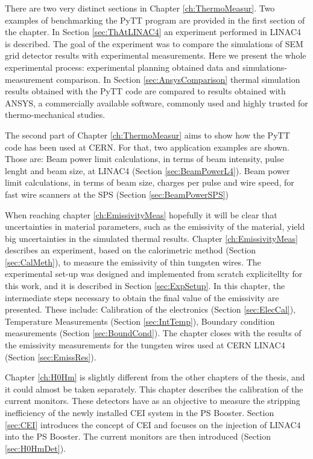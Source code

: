 There are two very distinct sections in Chapter \ref{ch:ThermoMeasur}. Two examples of benchmarking the PyTT program are provided in the first section of the chapter. In Section \ref{sec:ThAtLINAC4} an experiment performed in LINAC4 is described. The goal of the experiment was to compare the simulations of SEM grid detector results with experimental measurements. Here we present the whole experimental process: experimental planning obtained data and simulations-measurement comparison. In Section \ref{sec:AnsysComparison} thermal simulation results obtained with the PyTT code are compared to results obtained with ANSYS, a commercially available software, commonly used and highly trusted for thermo-mechanical studies. 

The second part of Chapter \ref{ch:ThermoMeasur} aims to show how the PyTT code has been used at CERN. For that, two application examples are shown. Those are: Beam power limit calculations, in terms of beam intensity, pulse lenght and beam size, at LINAC4 (Section \ref{sec:BeamPowerL4}).  Beam power limit calculations, in terms of beam size, charges per pulse and wire speed, for fast wire scanners at the SPS (Section \ref{sec:BeamPowerSPS})

When reaching chapter \ref{ch:EmissivityMeas} hopefully it will be clear that uncertainties in material parameters, such as the emissivity of the material, yield big uncertainties in the simulated thermal results. Chapter \ref{ch:EmissivityMeas} describes an experiment, based on the calorimetric method (Section \ref{sec:CalMeth}), to measure the emissivity of thin tungsten wires. The experimental set-up was designed and implemented from scratch explicitellty for this work, and it is described in Section \ref{sec:ExpSetup}. In this chapter, the intermediate steps necessary to obtain the final value of the emissivity are presented. These include: Calibration of the electronics (Section \ref{sec:ElecCal}), Temperature Measurements (Section \ref{sec:IntTemp}), Boundary condition measurements (Section \ref{sec:BoundCond}). The chapter closes with the results of the emissivity measurements for the tungsten wires used at CERN  LINAC4 (Section \ref{sec:EmissRes}).

Chapter \ref{ch:H0Hm} is slightly different from the other chapters of the thesis, and it could almost be taken separately. This chapter describes the calibration of the \hzhm current monitors. These detectors have as an objective to measure the stripping inefficiency of the newly installed CEI system in the PS Booster. Section \ref{sec:CEI} introduces the concept of CEI and focuses on the injection of LINAC4 into the PS Booster. The \hzhm current monitors are then introduced (Section \ref{sec:H0HmDet}).

